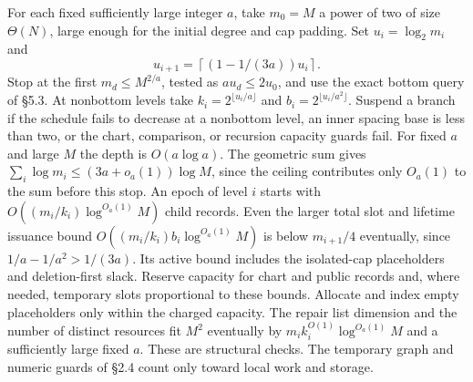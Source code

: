 \documentclass[11pt]{article}
\begin{document}
For each fixed sufficiently large integer \(a\), take \(m_0=M\) a power of two of size \(\Theta(N)\), large enough for the initial degree and cap padding. Set \(u_i=\log_2 m_i\) and
\[
 u_{i+1}=\left\lceil(1-1/(3a))u_i\right\rceil .
\]
Stop at the first \(m_d\le M^{2/a}\), tested as \(a u_d\le2u_0\), and use the exact bottom query of §5.3. At nonbottom levels take \(k_i=2^{\lfloor u_i/a\rfloor}\) and \(b_i=2^{\lfloor u_i/a^2\rfloor}\). Suspend a branch if the schedule fails to decrease at a nonbottom level, an inner spacing base is less than two, or the chart, comparison, or recursion capacity guards fail. For fixed \(a\) and large \(M\) the depth is \(O(a\log a)\). The geometric sum gives \(\sum_i\log m_i\le(3a+o_a(1))\log M\), since the ceiling contributes only \(O_a(1)\) to the sum before this stop. An epoch of level \(i\) starts with \(O((m_i/k_i)\log^{O_a(1)}M)\) child records. Even the larger total slot and lifetime issuance bound \(O((m_i/k_i)b_i\log^{O_a(1)}M)\) is below \(m_{i+1}/4\) eventually, since \(1/a-1/a^2>1/(3a)\). Its active bound includes the isolated-cap placeholders and deletion-first slack. Reserve capacity for chart and public records and, where needed, temporary slots proportional to these bounds. Allocate and index empty placeholders only within the charged capacity. The repair list dimension and the number of distinct resources fit \(M^2\) eventually by \(m_i k_i^{O(1)}\log^{O_a(1)}M\) and a sufficiently large fixed \(a\). These are structural checks. The temporary graph and numeric guards of §2.4 count only toward local work and storage.
\end{document}

